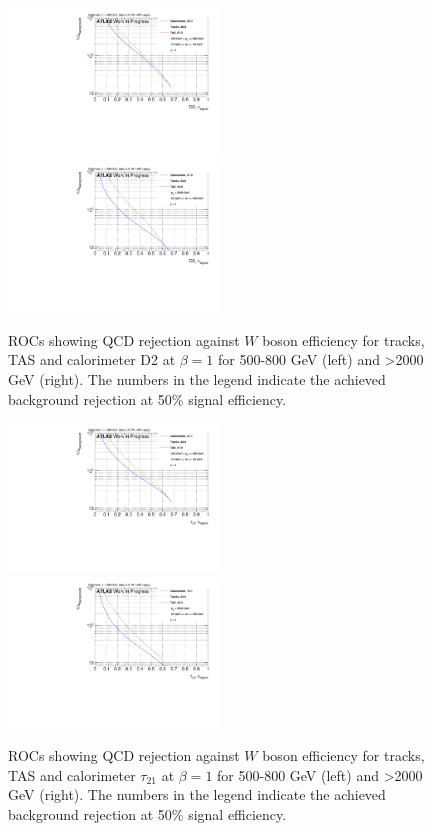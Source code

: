 \begin{figure}[htp]
\includegraphics[width=0.5\textwidth]{sascha_input/plots/W/beta1/ROC_ALL_h_recoJet_D2_bin2.pdf}
\includegraphics[width=0.5\textwidth]{sascha_input/plots/W/beta1/ROC_ALL_h_recoJet_D2_bin6.pdf}
\caption{{ROCs showing QCD rejection against $W$ boson efficiency for tracks, TAS and calorimeter D2 at $\beta=1$ for 500-800 GeV (left) and >2000 GeV (right). The numbers in the legend indicate the achieved background rejection at 50\% signal efficiency.}}\label{fig:ROC_W_D2}
\end{figure}

\begin{figure}[htp]
\includegraphics[width=0.5\textwidth]{sascha_input/plots/W/beta1/ROC_ALL_h_recoJet_nSub21_bin2.pdf}
\includegraphics[width=0.5\textwidth]{sascha_input/plots/W/beta1/ROC_ALL_h_recoJet_nSub21_bin6.pdf}
\caption{{ROCs showing QCD rejection against $W$ boson efficiency for tracks, TAS and calorimeter $\tau_{21}$ at $\beta=1$ for 500-800 GeV (left) and >2000 GeV (right). The numbers in the legend indicate the achieved background rejection at 50\% signal efficiency.}}\label{fig:ROC_W_nSub21}
\end{figure}


